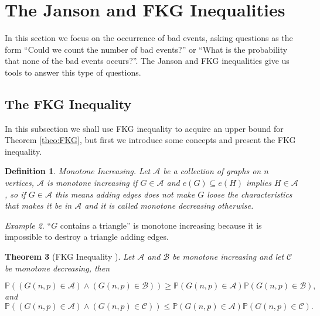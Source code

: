 \documentclass[12pt,twoside,a4paper,bibliography=totocnumbered]{book}
\numberwithin{equation}{section}
\newtheorem{theorem}             {Theorem}[section]
\newtheorem{definition}	[theorem] {Definition}
\theoremstyle{remark}
\newtheorem{example}	[theorem] {Example}
\begin{document}
\section{The Janson and FKG Inequalities}

In this section we focus on the occurrence of  bad events, asking questions as the form ``Could we count the number of bad events?'' or ``What is the probability that none of the bad events occurs?''. The Janson and FKG inequalities give us tools to answer this type of questions.

\subsection{The FKG Inequality}
In this subsection we shall use FKG inequality to acquire an upper bound for Theorem \ref{theo:FKG}, but first we introduce some concepts and present the FKG inequality.

\begin{definition}
Monotone Increasing. Let $\mathcal{A}$ be a collection of graphs on $n$ vertices, $\mathcal{A}$ is monotone increasing if $G \in \mathcal{A}$ and $e(G) \subseteq e(H)$ implies $H \in \mathcal{A}$, so if $G \in \mathcal{A}$ this means adding edges does not make $G$ loose the characteristics that makes it be in $\mathcal{A}$ and it is called monotone decreasing otherwise.     
\end{definition}

\begin{example}
``$G$ contains a triangle'' is monotone increasing because it is impossible to destroy a triangle adding edges.
\end{example}

\begin{theorem} [{FKG Inequality \cite{FKG71}}]
 Let $\mathcal{A}$ and $\mathcal{B}$ be monotone increasing and let $\mathcal{C}$ be monotone decreasing, then

$$ \mathbb{P}((G(n,p) \in \mathcal{A}) \wedge (G(n,p) \in \mathcal{B})) \geq \mathbb{P}(G(n,p) \in \mathcal{A})\mathbb{P}(G(n,p) \in \mathcal{B}),$$
and
$$ \mathbb{P}((G(n,p) \in \mathcal{A}) \wedge (G(n,p) \in \mathcal{C})) \leq \mathbb{P}(G(n,p) \in \mathcal{A})\mathbb{P}(G(n,p) \in \mathcal{C}).$$
\end{theorem}
\end{document}
